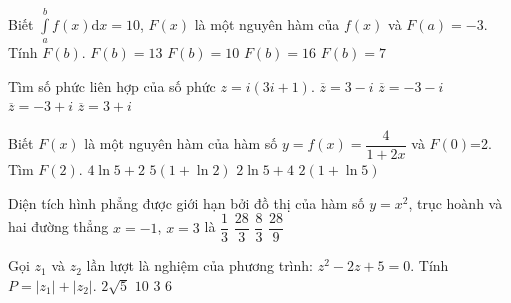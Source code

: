 \begin{ex}%
	Biết $\displaystyle \int\limits_a^b{f(x)\mathrm{d}x}=10$,  $F(x)$ là một nguyên hàm của $f(x)$ và $F(a)=-3$. Tính $F(b)$.
	\choice
	{$F(b)=13$}
	{$F(b)=10$}
	{$F(b)=16$}
	{\True $F(b)=7$}
\end{ex}
\begin{ex}%
	Tìm số phức liên hợp của số phức $z=i(3i+1)$.
	\choice
	{$\overline{z}=3-i$}
	{\True $\overline{z}=-3-i$}
	{$\overline{z}=-3+i$}
	{$\overline{z}=3+i$}
\end{ex}
\begin{ex}%
	Biết $F(x)$ là một nguyên hàm của hàm số $y=f(x)=\dfrac{4}{1+2x}$ và  $F(0)$=2. Tìm $F(2)$.
	\choice
	{$4\ln 5+2$}
	{$5\left(1+\ln 2\right)$}
	{$2\ln 5+4$}
	{\True $2(1+\ln5)$}
\end{ex}
\begin{ex}%
	Diện tích hình phẳng được giới hạn bởi đồ thị của hàm số $y=x^2$, trục hoành và hai đường thẳng $x=-1$, $x=3$ là
	\choice
	{$\dfrac{1}{3}$}
	{\True $\dfrac{28}{3}$}
	{$\dfrac{8}{3}$}
	{$\dfrac{28}{9}$}
\end{ex}
\begin{ex}%
	Gọi $z_1$ và $z_2$ lần lượt là nghiệm của phương trình: $z^2-2z+5=0$. Tính $P=\left| z_1\right|+\left| z_2\right|$.
	\choice
	{\True $2\sqrt{5}$}
	{$10$}
	{$3$}
	{$6$}
\end{ex}
